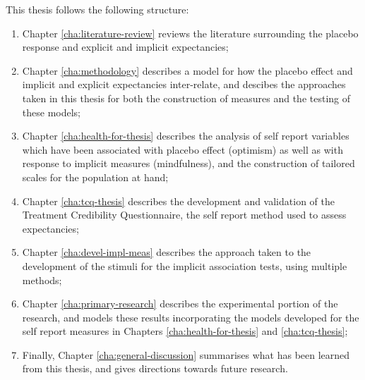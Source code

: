 This thesis follows the following structure:

\begin{enumerate}
\item Chapter \ref{cha:literature-review} reviews the literature surrounding the placebo response and explicit and implicit expectancies;

\item Chapter \ref{cha:methodology} describes a model for how the placebo effect and implicit and explicit expectancies inter-relate, and descibes the approaches taken in this thesis for both the construction of measures and the testing of these models;


\item Chapter \ref{cha:health-for-thesis} describes the analysis of self report variables which have been associated with placebo effect (optimism) as well as with response to implicit measures (mindfulness), and the construction of tailored scales for the population at hand;

\item Chapter \ref{cha:tcq-thesis} describes the development and validation of the Treatment Credibility Questionnaire, the self report method used to assess expectancies;

\item Chapter \ref{cha:devel-impl-meas} describes the approach taken to the development of the stimuli for the implicit association tests, using multiple methods;

\item Chapter \ref{cha:primary-research} describes the experimental portion of the research, and models these results incorporating the models developed for the self report measures in Chapters \ref{cha:health-for-thesis} and \ref{cha:tcq-thesis};

\item Finally, Chapter \ref{cha:general-discussion} summarises what has been learned from this thesis, and gives directions towards future research.

\end{enumerate}



